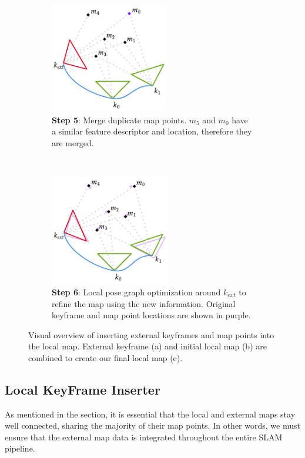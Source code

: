 \begin{figure}[h]
\begin{subfigure}[t]{0.333\textwidth}
    \end{subfigure}%
    ~
    \begin{subfigure}[t]{0.333\textwidth}
        \centering
        \includegraphics[height=1.9in]{figures/external_key_frame_insertion_4.pdf}
        \caption{\textbf{Step 5}: Merge duplicate map points. $m_5$ and $m_0$ have a similar feature descriptor and location, therefore they are merged.}
    \end{subfigure}%
    ~
    \begin{subfigure}[t]{0.333\textwidth}
        \centering
        \includegraphics[height=1.9in]{figures/external_key_frame_insertion_5.pdf}
        \caption{\textbf{Step 6}: Local pose graph optimization around $k_{ext}$ to refine the map using the new information. Original keyframe and map point locations are shown in purple.}
    \end{subfigure}%

    \caption{Visual overview of inserting external keyframes and map points into the local map. External keyframe (a) and initial local map (b) are combined to create our final local map (e).}
    \label{fig:external-keyframe-inserter}

\end{figure}


\subsection{Local KeyFrame Inserter}
\label{sec:local-key-frame-inserter}
As mentioned in the  section, it is essential that the local and external maps stay well connected, sharing the majority of their map points. In other words, we must ensure that the external map data is integrated throughout the entire SLAM pipeline.

